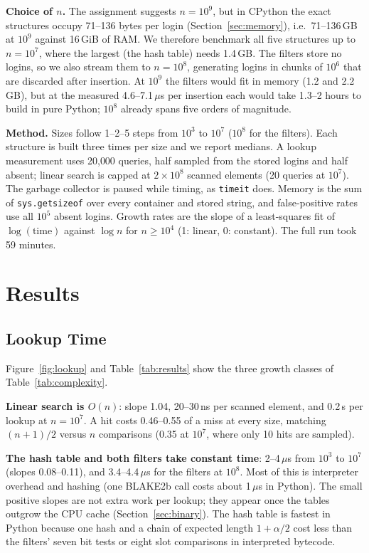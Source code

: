 \documentclass[acmsmall,nonacm]{acmart}
\newcommand{\us}{\,$\mu$s}
\newcommand{\code}[1]{\texttt{#1}}
\begin{document}
\textbf{Choice of $n$.} The assignment suggests $n = 10^9$, but in CPython the
exact structures occupy 71--136 bytes per login (Section~\ref{sec:memory}), i.e.\
71--136\,GB at $10^9$ against 16\,GiB of RAM. We therefore benchmark all five
structures up to $n = 10^7$, where the largest (the hash table) needs 1.4\,GB.
The filters store no logins, so we also stream them to $n = 10^8$, generating
logins in chunks of $10^6$ that are discarded after insertion. At $10^9$ the
filters would fit in memory (1.2 and 2.2\,GB), but at the measured
4.6--7.1\us{} per insertion each would take 1.3--2 hours to build in pure
Python; $10^8$ already spans five orders of magnitude.

\textbf{Method.} Sizes follow 1--2--5 steps from $10^3$ to $10^7$ ($10^8$ for the
filters). Each structure is built three times per size and we report medians.
A lookup measurement uses 20{,}000 queries, half sampled from the stored logins
and half absent; linear search is capped at $2 \times 10^8$ scanned elements
(20 queries at $10^7$). The garbage collector is paused while timing, as
\code{timeit} does. Memory is the sum of \code{sys.getsizeof} over every
container and stored string, and false-positive rates use all $10^5$ absent
logins. Growth rates are the slope of a least-squares fit of
$\log(\text{time})$ against $\log n$ for $n \ge 10^4$ (1: linear, 0: constant).
The full run took 59 minutes.

\section{Results}
\label{sec:results}

\subsection{Lookup Time}

Figure~\ref{fig:lookup} and Table~\ref{tab:results} show the three growth
classes of Table~\ref{tab:complexity}.

\textbf{Linear search is $O(n)$}: slope 1.04, 20--30\,ns per scanned element,
and 0.2\,s per lookup at $n = 10^7$. A hit costs 0.46--0.55 of a miss at every
size, matching $(n+1)/2$ versus $n$ comparisons (0.35 at $10^7$, where only 10
hits are sampled).

\textbf{The hash table and both filters take constant time}: 2--4\us{} from
$10^3$ to $10^7$ (slopes 0.08--0.11), and 3.4--4.4\us{} for the filters at
$10^8$. Most of this is interpreter overhead and hashing (one BLAKE2b call costs
about 1\us{} in Python). The small positive slopes are not extra work per
lookup; they appear once the tables outgrow the CPU cache
(Section~\ref{sec:binary}). The hash table is fastest in Python because one
hash and a chain of expected length $1 + \alpha/2$ cost less than the filters'
seven bit tests or eight slot comparisons in interpreted bytecode.
\end{document}
